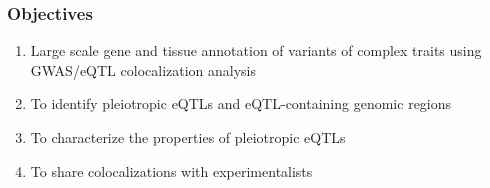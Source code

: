 \documentclass{beamer}
\begin{document}
    \begin{frame}
        \frametitle{Objectives}

        \begin{enumerate}
            \item Large scale gene and tissue annotation of variants of complex traits using GWAS/eQTL colocalization analysis
            \item To identify pleiotropic eQTLs and eQTL-containing genomic regions
            \item To characterize the properties of pleiotropic eQTLs
            \item To share colocalizations with experimentalists
        \end{enumerate}
    \end{frame}
\end{document}
